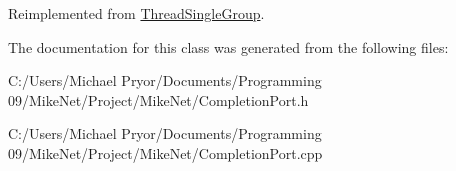 Reimplemented from \hyperlink{class_thread_single_group_a26f35ba9c432a49de2ca2e446add6888}{ThreadSingleGroup}.



The documentation for this class was generated from the following files:\begin{DoxyCompactItemize}
\item 
C:/Users/Michael Pryor/Documents/Programming 09/MikeNet/Project/MikeNet/CompletionPort.h\item 
C:/Users/Michael Pryor/Documents/Programming 09/MikeNet/Project/MikeNet/CompletionPort.cpp\end{DoxyCompactItemize}

